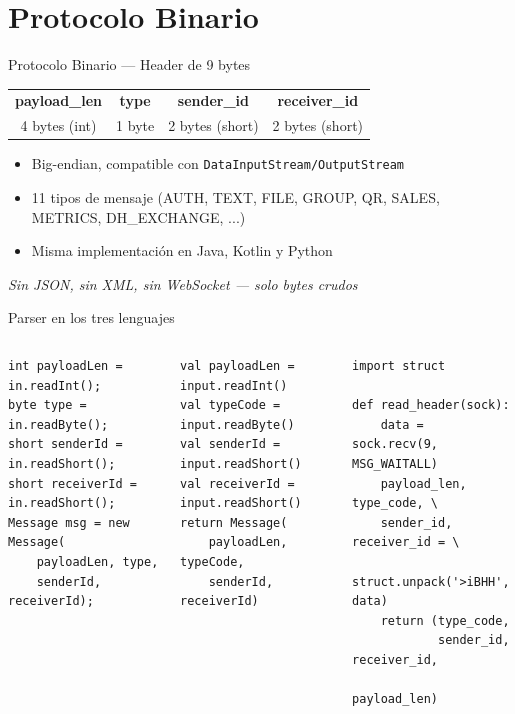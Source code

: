 \documentclass[aspectratio=169,14pt]{beamer}
\begin{document}
\section{Protocolo Binario}

\begin{frame}{Protocolo Binario --- Header de 9 bytes}
\begin{center}
\small
\begin{tabular}{|c|c|c|c|}
\hline
\textbf{payload\_len} & \textbf{type} & \textbf{sender\_id} & \textbf{receiver\_id} \\
4 bytes (int) & 1 byte & 2 bytes (short) & 2 bytes (short) \\
\hline
\end{tabular}
\end{center}

\vfill
\begin{itemize}
  \item Big-endian, compatible con \texttt{DataInputStream/OutputStream}
  \item 11 tipos de mensaje (AUTH, TEXT, FILE, GROUP, QR, SALES, METRICS, DH\_EXCHANGE, ...)
  \item Misma implementación en Java, Kotlin y Python
\end{itemize}

\vfill
\centering
\emph{Sin JSON, sin XML, sin WebSocket --- solo bytes crudos}
\end{frame}

\begin{frame}[fragile]{Parser en los tres lenguajes}
\begin{columns}[T]
\begin{lstlisting}[style=java]
int payloadLen = in.readInt();
byte type = in.readByte();
short senderId = in.readShort();
short receiverId = in.readShort();
Message msg = new Message(
    payloadLen, type,
    senderId, receiverId);
\end{lstlisting}
\begin{lstlisting}[style=kotlin]
val payloadLen = input.readInt()
val typeCode = input.readByte()
val senderId = input.readShort()
val receiverId = input.readShort()
return Message(
    payloadLen, typeCode,
    senderId, receiverId)
\end{lstlisting}
\begin{lstlisting}[style=python]
import struct

def read_header(sock):
    data = sock.recv(9, MSG_WAITALL)
    payload_len, type_code, \
    sender_id, receiver_id = \
        struct.unpack('>iBHH', data)
    return (type_code,
            sender_id, receiver_id,
            payload_len)
\end{lstlisting}
\end{columns}
\end{frame}
\end{document}

